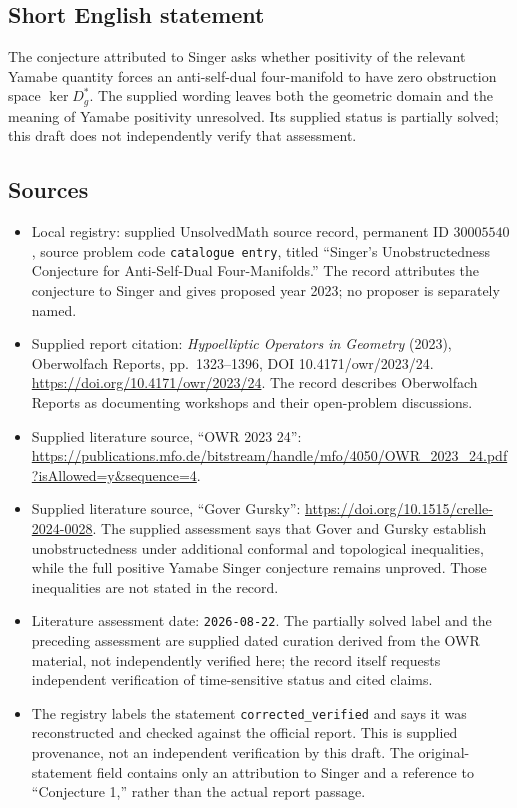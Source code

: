 \documentclass[11pt]{article}
\begin{document}
\subsection{Short English statement}
The conjecture attributed to Singer asks whether positivity of the relevant Yamabe quantity forces an anti-self-dual four-manifold to have zero obstruction space \(\ker D_g^*\). The supplied wording leaves both the geometric domain and the meaning of Yamabe positivity unresolved. Its supplied status is partially solved; this draft does not independently verify that assessment.
\subsection{Sources}
\begin{itemize}
\item Local registry: supplied UnsolvedMath source record, permanent ID \(30005540\), source problem code \texttt{catalogue entry}, titled ``Singer's Unobstructedness Conjecture for Anti-Self-Dual Four-Manifolds.'' The record attributes the conjecture to Singer and gives proposed year 2023; no proposer is separately named.
\item Supplied report citation: \emph{Hypoelliptic Operators in Geometry} (2023), Oberwolfach Reports, pp.\ 1323--1396, DOI 10.4171/owr/2023/24. \url{https://doi.org/10.4171/owr/2023/24}. The record describes Oberwolfach Reports as documenting workshops and their open-problem discussions.
\item Supplied literature source, ``OWR 2023 24'': \url{https://publications.mfo.de/bitstream/handle/mfo/4050/OWR_2023_24.pdf?isAllowed=y&sequence=4}.
\item Supplied literature source, ``Gover Gursky'': \url{https://doi.org/10.1515/crelle-2024-0028}. The supplied assessment says that Gover and Gursky establish unobstructedness under additional conformal and topological inequalities, while the full positive Yamabe Singer conjecture remains unproved. Those inequalities are not stated in the record.
\item Literature assessment date: \texttt{2026-08-22}. The partially solved label and the preceding assessment are supplied dated curation derived from the OWR material, not independently verified here; the record itself requests independent verification of time-sensitive status and cited claims.
\item The registry labels the statement \texttt{corrected\_verified} and says it was reconstructed and checked against the official report. This is supplied provenance, not an independent verification by this draft. The original-statement field contains only an attribution to Singer and a reference to ``Conjecture 1,'' rather than the actual report passage.
\end{itemize}
\end{document}
